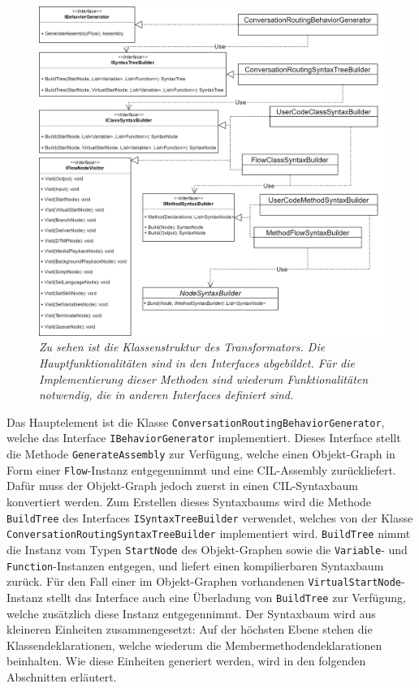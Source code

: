 \begin{figure} %
	\centering
		\includegraphics[width=\textwidth]{img/TransformatorUML.png}
	\caption[Klassenstruktur des Transformators]{\textit{Zu sehen ist die Klassenstruktur des Transformators. Die Hauptfunktionalitäten sind in den Interfaces abgebildet. Für die Implementierung dieser Methoden sind wiederum Funktionalitäten notwendig, die in anderen Interfaces definiert sind.}}
	\label{fig:UML:Transformator}
\end{figure}
\noindent Das Hauptelement ist die Klasse \texttt{ConversationRoutingBehaviorGenerator}, welche das Interface \texttt{IBehaviorGenerator} implementiert. Dieses Interface stellt die Methode \texttt{GenerateAssembly} zur Verfügung, welche einen Objekt-Graph in Form einer \texttt{Flow}-Instanz entgegennimmt und eine CIL-Assembly zurückliefert.  Dafür muss der Objekt-Graph jedoch zuerst in einen CIL-Syntaxbaum konvertiert werden. Zum Erstellen dieses Syntaxbaums wird die Methode \texttt{BuildTree} des Interfaces \texttt{ISyntaxTreeBuilder} verwendet, welches von der Klasse \texttt{Con\-ver\-sa\-tion\-Rou\-ting\-Syn\-tax\-Tree\-Buil\-der} implementiert wird. \texttt{BuildTree} nimmt die Instanz vom Typen \texttt{StartNode} des Objekt-Graphen sowie die \texttt{Variable}- und \texttt{Function}-Instanzen entgegen, und liefert einen kompilierbaren Syntaxbaum zurück. Für den Fall einer im Objekt-Graphen vorhandenen \texttt{Vir\-tu\-al\-Start\-Node}-Instanz stellt das Interface auch eine Überladung von \texttt{Build\-Tree} zur Verfügung, welche zusätzlich diese Instanz entgegennimmt. Der Syntaxbaum wird aus kleineren Einheiten zusammengesetzt: Auf der höchsten Ebene stehen die Klassendeklarationen, welche wiederum die Membermethodendeklarationen beinhalten. Wie diese Einheiten generiert werden, wird in den folgenden Abschnitten erläutert.

